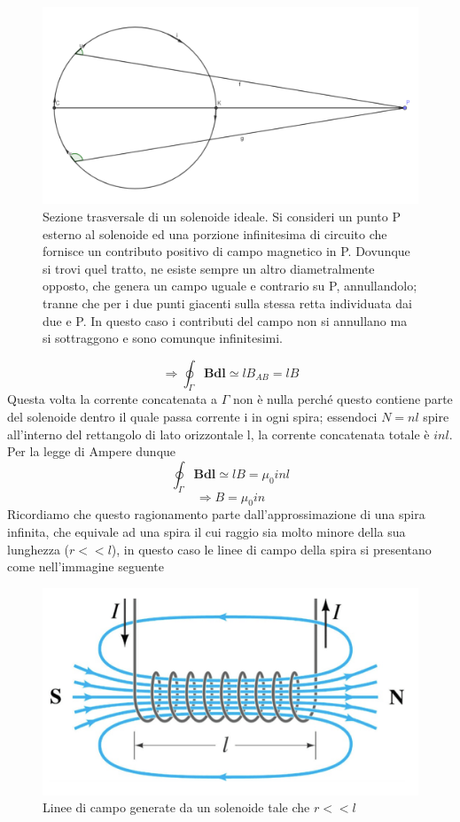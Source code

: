 \documentclass[
10pt, %
a4paper, %
oneside, %
headinclude,footinclude, %
BCOR5mm, %
]{scrartcl}
\begin{document}
\begin{figure}[h!]
	\centering
	\includegraphics[width=0.7\linewidth]{../images/campo_esterno_spira}
	\caption{Sezione trasversale di un solenoide ideale. Si consideri un punto P esterno al solenoide ed una porzione infinitesima di circuito che fornisce un contributo positivo di campo magnetico in P. Dovunque si trovi quel tratto, ne esiste sempre un altro diametralmente opposto, che genera un campo uguale e contrario su P, annullandolo; tranne che per i due punti giacenti sulla stessa retta individuata dai due e P. In questo caso i contributi del campo non si annullano ma si sottraggono e sono comunque infinitesimi.}
	\label{fig:campoesternospira}
\end{figure}
\FloatBarrier
\[\Rightarrow \oint_{\Gamma}\mathbf{B}\mathbf{dl}\simeq lB_{AB}= lB\]
Questa volta la corrente concatenata a $\Gamma$ non è nulla perché questo contiene parte del solenoide dentro il quale passa corrente i in ogni spira; essendoci \(N = n l\) spire all'interno del rettangolo di lato orizzontale l, la corrente concatenata totale è \(inl\). Per la legge di Ampere dunque
\[\oint_{\Gamma}\mathbf{B}\mathbf{dl}\simeq lB= \mu_0 inl\]
\[\Rightarrow B = \mu_0 i n\]
Ricordiamo che questo ragionamento parte dall'approssimazione di una spira infinita, che equivale ad una spira il cui raggio sia molto minore della sua lunghezza (\(r<<l\)), in questo caso le linee di campo della spira si presentano come nell'immagine seguente
\begin{figure}[h!]
	\centering
	\includegraphics[width=0.6\linewidth]{../images/linee_campo_solenoide}
	\caption{Linee di campo generate da un solenoide tale che \(r<<l\)}
	\label{fig:lineecamposolenoide}
\end{figure}
\end{document}
